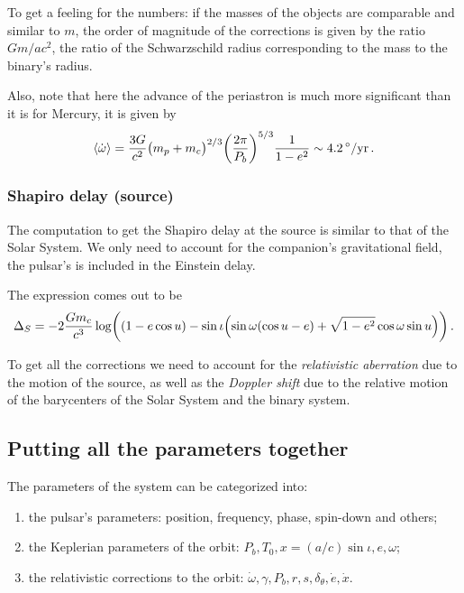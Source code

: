 \documentclass[main.tex]{subfiles}
\begin{document}
To get a feeling for the numbers: if the masses of the objects are comparable and similar to \(m\), the order of magnitude of the corrections is given by the ratio \(G m / a c^2\), the ratio of the Schwarzschild radius corresponding to the mass to the binary's radius.

Also, note that here the advance of the periastron is much more significant than it is for Mercury, it is given by 
%
\begin{align}
\expval{\dot{\omega}}
= \frac{3G }{c^2} \qty(m_p +m_c)^{2/3} \qty( \frac{2 \pi }{P_b})^{5/3}
\frac{1}{1 - e^2} \sim \SI{4.2}{\degree / yr}
\,.
\end{align}

\subsubsection{Shapiro delay (source)}

The computation to get the Shapiro delay at the source is similar to that of the Solar System.  
We only need to account for the companion's gravitational field, the pulsar's is included in the Einstein delay.

The expression comes out to be 
%
\begin{align}
\Delta_{S} = - 2 \frac{G m_c}{c^3} \log
((1 - e \cos u) - \sin \iota \qty(\sin \omega \qty(\cos u - e) + \sqrt{1 - e^2} \cos \omega \sin u)) 
\,.
\end{align}

To get all the corrections we need to account for the \emph{relativistic aberration} due to the motion of the source, as well as the \emph{Doppler shift} due to the relative motion of the barycenters of the Solar System and the binary system.


\subsection{Putting all the parameters together}

The parameters of the system can be categorized into: 
\begin{enumerate}
    \item the pulsar's parameters: position, frequency, phase, spin-down and others;
    \item the Keplerian parameters of the orbit: \(P_b, T_0, x= (a/c) \sin \iota , e, \omega \);
    \item the relativistic corrections to the orbit: \(\dot{\omega}
    , \gamma, P_b, r, s, \delta_{\theta }, \dot{e}, \dot{x}\).
\end{enumerate}
\end{document}

